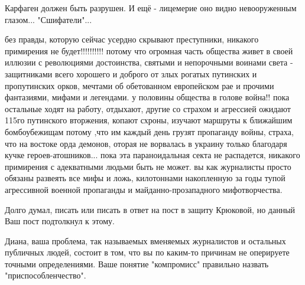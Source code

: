 \begin{itemize}
 
Карфаген должен быть разрушен. И ещё - лицемерие оно видно невооруженным глазом... "Сшифатели"...

 

без правды, которую сейчас усердно скрывают преступники, никакого примирения не
будет!!!!!!!!!! потому что огромная часть общества живет в своей иллюзии с
революциями достоинства, святыми и непорочными воинами света - защитниками
всего хорошего и доброго от злых рогатых путинских и пропутинских орков,
мечтами об обетованном европейском рае и прочими фантазиями, мифами и
легендами. у половины общества в голове война!! пока остальные ходят на работу,
отдыхают, другие со страхом и агрессией ожидают 115го путинского вторжения,
копают схроны, изучают маршруты к ближайшим бомбоубежищам потому ,что им каждый
день грузят пропаганду войны, страха, что на востоке орда демонов, оторая не
ворвалась в украину только благодаря кучке героев-атошников... пока эта
параноидальная секта не распадется, никакого примирения с адекватными людьми
быть не может. вы как журналисты просто обязаны развеять все мифы и ложь,
килотоннами накопленную за годы тупой агрессивной военной пропаганды и
майданно-прозападного мифотворчества.

\par

Долго думал, писать или писать в ответ на пост в защиту Крюковой, но данный Ваш
пост подтолкнул к этому. 

Диана, ваша проблема, так называемых вменяемых журналистов и остальных
публичных людей, состоит в том, что вы по каким-то причинам не оперируете
точными определениями. Ваше понятие "компромисс" правильно назвать
"приспособленчество". 


\end{itemize}
